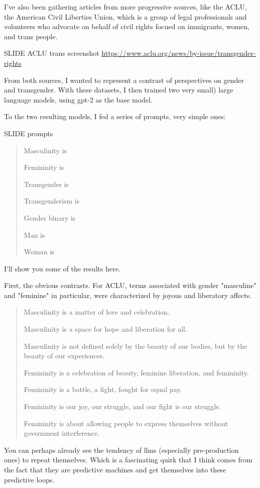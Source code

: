 \documentclass[11pt]{article}
\begin{document}
I've also been gathering articles from more progressive sources, like
the ACLU, the American Civil Liberties Union, which is a group of
legal professionals and volunteers who advocate on behalf of civil
rights focued on immigrants, women, and trans people.

SLIDE ACLU trans screenshot
\url{https://www.aclu.org/news/by-issue/transgender-rights} 

From both sources, I wanted to represent a contrast of perspectives on
gender and transgender. With these datasets, I then trained two very
small) large language models, using gpt-2 as the base model.

To the two resulting models, I fed a series of prompts, very simple
ones:

SLIDE prompts

\begin{quote}
Masculinity is

Femininity is

Transgender is

Transgenderism is

Gender binary is

Man is

Woman is
\end{quote}

I'll show you some of the results here.

First, the obvious contrasts. For ACLU, terms associated with gender
"masculine" and "feminine" in particular, were characterized by joyous
and liberatory affects.

\begin{quote}
Masculinity is a matter of love and celebration.

Masculinity is a space for hope and liberation for all.

Masculinity is not defined solely by the beauty of our bodies, but by
the beauty of our experiences.

Femininity is a celebration of beauty, feminine liberation, and femininity.

Femininity is a battle, a fight, fought for equal pay.

Femininity is our joy, our struggle, and our fight is our struggle.

Femininity is about allowing people to express themselves without government interference. 
\end{quote}

You can perhaps already see the tendency of llms (especially
pre-production ones) to repeat themselves. Which is a fascinating
quirk that I think comes from the fact that they are predictive
machines and get themselves into these predictive loops. 
\end{document}

